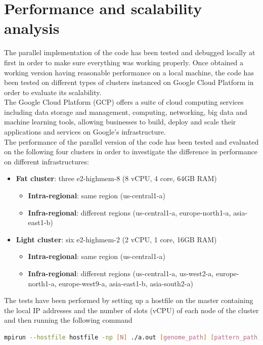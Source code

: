 \documentclass[final,5p,times,twocolumn,authoryear]{elsarticle}
\begin{document}
\section{Performance and scalability analysis}
The parallel implementation of the code has been tested and debugged locally at first in order to make sure everything was working properly. Once obtained a working version having reasonable performance on a local machine, the code has been tested on different types of clusters instanced on Google Cloud Platform in order to evaluate its scalability. \\
The Google Cloud Platform (GCP) offers a suite of cloud computing services including data storage and management, computing, networking, big data and machine learning tools, allowing businesses to build, deploy and scale their applications and services on Google's infrastructure. \\
The performance of the parallel version of the code has been tested and evaluated on the following four clusters in order to investigate the difference in performance on different infrastructures:
\begin{itemize}
    \item \textbf{Fat cluster}: three e2-highmem-8 (8 vCPU, 4 core, 64GB RAM)
    \begin{itemize}
        \item \textbf{Intra-regional}: same region (us-central1-a)
        \item \textbf{Infra-regional}: different regions (us-central1-a, europe-north1-a, asia-east1-b)
    \end{itemize}
    \item \textbf{Light cluster}: six e2-highmem-2 (2 vCPU, 1 core, 16GB RAM)
    \begin{itemize}
        \item \textbf{Intra-regional}: same region (us-central1-a)
        \item \textbf{Infra-regional}: different regions (us-central1-a, us-west2-a, europe-north1-a, europe-west9-a, asia-east1-b, asia-south2-a)
    \end{itemize}
\end{itemize}
The tests have been performed by setting up a hostfile on the master containing the local IP addresses and the number of slots (vCPU) of each node of the cluster and then running the following command \\
\begin{lstlisting}[language=bash]
mpirun --hostfile hostfile -np [N] ./a.out [genome_path] [pattern_path]
\end{lstlisting}
\end{document}
